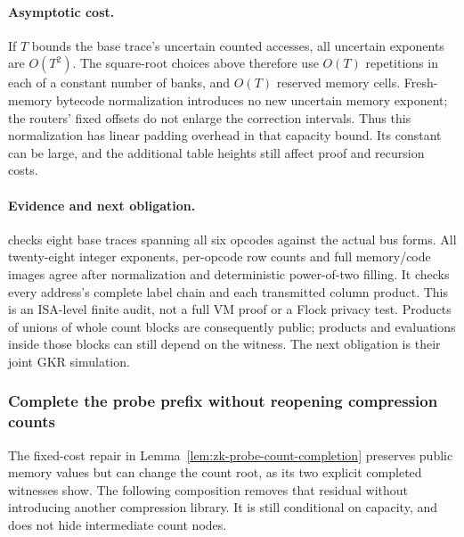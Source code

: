 \paragraph{Asymptotic cost.} If $T$ bounds the base trace's uncertain counted accesses, all uncertain exponents are $O(T^2)$. The square-root choices above therefore use $O(T)$ repetitions in each of a constant number of banks, and $O(T)$ reserved memory cells. Fresh-memory bytecode normalization introduces no new uncertain memory exponent; the routers' fixed offsets do not enlarge the correction intervals. Thus this normalization has linear padding overhead in that capacity bound. Its constant can be large, and the additional table heights still affect proof and recursion costs.

\paragraph{Evidence and next obligation.}  checks eight base traces spanning all six opcodes against the actual bus forms. All twenty-eight integer exponents, per-opcode row counts and full memory/code images agree after normalization and deterministic power-of-two filling. It checks every address's complete label chain and each transmitted column product. This is an ISA-level finite audit, not a full VM proof or a Flock privacy test. Products of unions of whole count blocks are consequently public; products and evaluations inside those blocks can still depend on the witness. The next obligation is their joint GKR simulation.

\subsubsection{Complete the probe prefix without reopening compression counts}

The fixed-cost repair in Lemma~\ref{lem:zk-probe-count-completion} preserves public memory values but can change the count root, as its two explicit completed witnesses show. The following composition removes that residual without introducing another compression library. It is still conditional on capacity, and does not hide intermediate count nodes.

